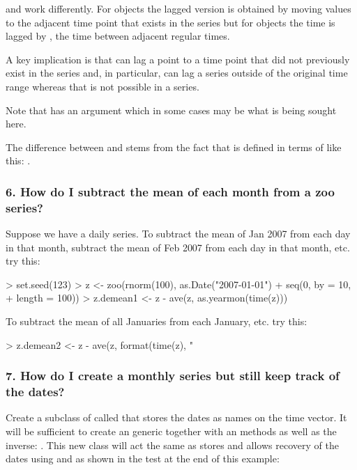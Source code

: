\documentclass[article,nojss]{jss}
\newcommand{\mysection}[1]{\subsubsection[#1]{\textbf{#1}}}
\begin{document}
 and  work differently.  For 
objects the lagged version is obtained by moving values 
to the adjacent time point that exists in the series but for  
objects the time is lagged by , the time between adjacent
regular times.

A key implication is that  can lag a point to a time point
that did not previously exist in the series and, in particular, can lag
a series outside of the original time range whereas that is not possible
in a  series.

Note that  has an  argument which in some
cases may be what is being sought here.

The difference between  and  stems from
the fact that  is defined in terms of  like
this: .

\mysection{6. How do I subtract the mean of each month from a zoo series?}

Suppose we have a daily series.
To subtract the mean of Jan 2007 from each day in that month,
subtract the mean of Feb 2007 from each day in that month, etc.
try this:
     
\begin{Schunk}
\begin{Sinput}
> set.seed(123)
> z <- zoo(rnorm(100), as.Date("2007-01-01") + seq(0, by = 10, 
+     length = 100))
> z.demean1 <- z - ave(z, as.yearmon(time(z)))
\end{Sinput}
\end{Schunk}

To subtract the mean of all Januaries from each January, etc.
try this:

\begin{Schunk}
\begin{Sinput}
> z.demean2 <- z - ave(z, format(time(z), "%
\end{Sinput}
\end{Schunk}

\mysection{7. How do I create a monthly series but still keep track of the dates?}

Create a  subclass of  called  that 
stores the dates as names on the time vector.  It will be sufficient to create
an  generic together with an
 methods as well as the inverse:
.
This new class will act the same as  
stores and allows recovery of the dates using  and
 as shown in the test at the end of this example:
\end{document}
